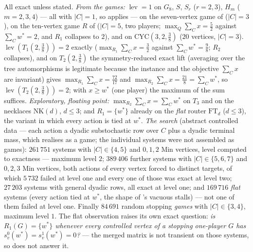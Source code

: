 \begin{remark}\label{xc:measured}
All exact unless stated.  \emph{From the games:} $\operatorname{lev}=1$ on $G_8$, $S$, $S_r$
($r=2,3$), $H_m$ ($m=2,3,4$) --- all with $|C|=1$, so  applies --- on the
seven-vertex game of  ($|C|=3$), on the ten-vertex game $R$ of
 ($|C|=5$, two players; $\max_{Q}\sum_{C}x=\tfrac52$ against
$\sum_{C}w^{\ast}=2$, and $R_1$ collapses to $2$), and on $\mathrm{CYC}(3,2,\tfrac38)$
($20$ vertices, $|C|=3$).  $\operatorname{lev}(T_1(2,\tfrac38))=2$ exactly
($\max_{R_1}\sum_{C}x=\tfrac32$ against $\sum_{C}w^{\ast}=\tfrac98$; $R_2$ collapses), and on
$T_2(2,\tfrac38)$ the symmetry-reduced exact lift (averaging over the tree automorphisms is
legitimate because the instance and the objective $\sum_Cx$ are invariant) gives
$\max_{R_1}\sum_{C}x=\tfrac{72}{17}$ and $\max_{R_2}\sum_Cx=\tfrac{21}{8}=\sum_Cw^{\ast}$,
so $\operatorname{lev}(T_2(2,\tfrac38))=2$; with $x\ge w^{\ast}$ (one player) the maximum of
the sum suffices.  \emph{Exploratory, floating point:} $\max_{R_2}\sum_Cx=\sum_Cw^{\ast}$ on
$T_3$ and on the necklaces $\mathrm{NK}(d)$, $d\le3$; and $R_1=\{w^{\ast}\}$ already on the
\emph{flat} router $\mathrm{FT}_d$ ($d\le3$), the variant in which every action is tied at
$w^{\ast}$.  \emph{The search} (abstract controlled data --- each action a dyadic
substochastic row over $C$ plus a dyadic terminal mass, which  realises as
a game; the individual systems were not assembled as games): $261\,751$ systems with
$|C|\in\{4,5\}$ and $0,1,2$ Min vertices, level computed to exactness --- maximum level $2$;
$389\,406$ further systems with $|C|\in\{5,6,7\}$ and $0,2,3$ Min vertices, both actions of
every vertex forced to distinct targets, of which $5\,732$ failed at level one and every one of
those was exact at level two; $27\,203$ systems with general dyadic rows, all exact at level
one; and $169\,716$ \emph{flat} systems (every action tied at $w^{\ast}$, the shape of
's vacuous stalls) --- not one of them failed at level one.  Finally
$84\,691$ random stopping \emph{games} with $|C|\in\{3,4\}$, maximum level $1$.  The flat
observation raises its own exact question: \emph{is $R_1(G)=\{w^{\ast}\}$ whenever every
controlled vertex of a stopping one-player $G$ has $s^{0}_{v}(w^{\ast})=s^{1}_{v}(w^{\ast})=0$?}
--- the merged matrix is not transient on those systems, so  does not
answer it.
\end{remark}

